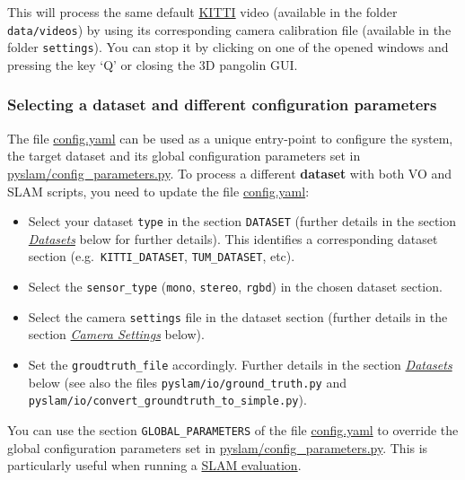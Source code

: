 \documentclass{article}
\begin{document}
This will process the same default
\href{http://www.cvlibs.net/datasets/kitti/eval_odometry.php}{KITTI}
video (available in the folder \texttt{data/videos}) by using its
corresponding camera calibration file (available in the folder
\texttt{settings}). You can stop it by clicking on one of the
opened windows and pressing the key `Q' or closing the 3D pangolin GUI.
\hypertarget{selecting-a-dataset-and-different-configuration-parameters}{%
\subsubsection{Selecting a dataset and different configuration
parameters}\label{selecting-a-dataset-and-different-configuration-parameters}}

The file \href{https://github.com/luigifreda/pyslam/blob/master/config.yaml}{config.yaml} can be used as a unique
entry-point to configure the system, the target dataset and its global
configuration parameters set in
\href{https://github.com/luigifreda/pyslam/blob/master/pyslam/config_parameters.py}{pyslam/config\_parameters.py}.
To process a different \textbf{dataset} with both VO and SLAM scripts,
you need to update the file \href{https://github.com/luigifreda/pyslam/blob/master/config.yaml}{config.yaml}:
\begin{itemize}
\item Select
your dataset \texttt{type} in the section \texttt{DATASET} (further
details in the section \emph{\protect\hyperlink{datasets}{Datasets}}
below for further details). This identifies a corresponding dataset
section (e.g.~\texttt{KITTI\_DATASET}, \texttt{TUM\_DATASET}, etc). 
\item  Select the \texttt{sensor\_type} (\texttt{mono}, \texttt{stereo},
\texttt{rgbd}) in the chosen dataset section.
\item  Select the camera \texttt{settings} file in the dataset section
(further details in the section
\emph{\protect\hyperlink{camera-settings}{Camera Settings}} below).
\item Set the \texttt{groudtruth\_file} accordingly. Further details in the
section \emph{\protect\hyperlink{datasets}{Datasets}} below (see also
the files \texttt{pyslam/io/ground\_truth.py} and
\texttt{pyslam/io/convert\_groundtruth\_to\_simple.py}).
\end{itemize}

You can use the section \texttt{GLOBAL\_PARAMETERS} of the file
\href{https://github.com/luigifreda/pyslam/blob/master/config.yaml}{config.yaml} to override the global configuration
parameters set in \href{https://github.com/luigifreda/pyslam/blob/master/pyslam/config_parameters.py}{pyslam/config\_parameters.py}.
This is particularly useful when running a
\protect\hyperlink{evaluating-slam}{SLAM evaluation}.
\end{document}
